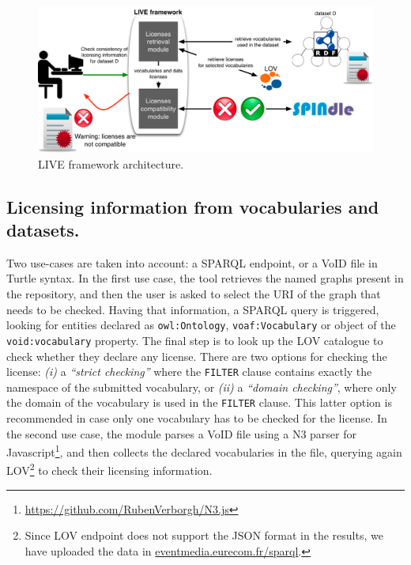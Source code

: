 \begin{figure}
\centering
\includegraphics[width=12.0cm]{img/live-framework.pdf}
\caption{LIVE framework architecture.}
\label{fig:framework}
\end{figure}


\subsection{Licensing information from vocabularies and datasets.}
Two use-cases are taken into account: a SPARQL endpoint, or a VoID file in Turtle syntax.
In the first use case, the tool retrieves the named graphs present in the repository, and then the user is asked to select the URI of the graph that needs to be checked. Having that information, a SPARQL query is triggered, looking for entities declared as \texttt{owl:Ontology}, \texttt{voaf:Vocabulary} or object  of the \texttt{void:vocabulary} property. The final step is to look up the LOV catalogue to check whether they declare any license. There are two options for checking the license: \textit{(i)} a \textit{``strict checking'' } where the \texttt{FILTER} clause contains exactly the namespace of the submitted vocabulary, or \textit{(ii)} a \textit{``domain checking''}, where only the domain of the vocabulary is used in the \texttt{FILTER} clause. This latter option is recommended in case only one vocabulary has to be checked for the license.
%
In the second use case, the module parses a VoID file using a N3 parser for Javascript\footnote{\url{https://github.com/RubenVerborgh/N3.js}}, and then collects the declared vocabularies in the file, querying again LOV\footnote{Since LOV endpoint does not support the JSON format in the results, we have uploaded the data in \url{eventmedia.eurecom.fr/sparql}.} to check their licensing information.
%
